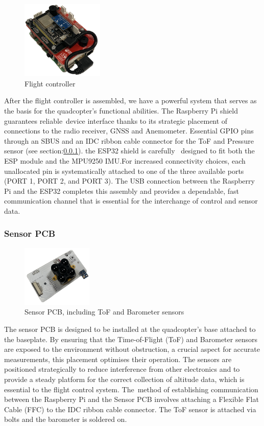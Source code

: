 \documentclass{article}
\begin{document}
\begin{figure}[H]
  \centering
  \includegraphics[width=0.35\textwidth]{Pictures/flight_controller.png}
  \caption{Flight controller}
  \label{fig:flightController2}
\end{figure}
After the flight controller is assembled, we have a powerful system that serves as the basis for the quadcopter's functional abilities. The Raspberry Pi shield guarantees reliable device interface thanks to its strategic placement of connections to the radio receiver, GNSS and Anemometer. Essential GPIO pins 
through an SBUS and an IDC ribbon cable connector for the ToF and Pressure sensor (see section:\ref{sensorpcb}). the ESP32 shield is carefully  designed to fit both the ESP module and the MPU9250 IMU.For increased connectivity choices, each unallocated pin is systematically attached to one of the three available ports (PORT 1, PORT 2, and PORT 3).
The USB connection between the Raspberry Pi and the ESP32 completes this assembly and provides a dependable, fast communication channel that is essential for the interchange of control and sensor data.

\subsubsection{Sensor PCB}\label{sensorpcb}
\begin{figure}[H]
  \centering
  \includegraphics[width=0.3\textwidth]{Pictures/sensorpcb.png}
  \caption{Sensor PCB, including ToF and Barometer sensors}
  \label{fig:sensorpcb}
\end{figure}
The sensor PCB is designed to be installed at the quadcopter's base attached to the baseplate. By ensuring that the Time-of-Flight (ToF) and Barometer sensors are exposed to the environment without obstruction, a crucial aspect for accurate measurements, this placement optimises their operation. The sensors are positioned strategically to reduce interference from other electronics and to provide a steady platform for the correct collection of altitude data, 
which is essential to the flight control system. The method of establishing communication between the Raspberry Pi and the Sensor PCB involves attaching a Flexible Flat Cable (FFC) to the IDC ribbon cable connector. The ToF sensor is attached via bolts and the barometer is soldered on.
\end{document}

